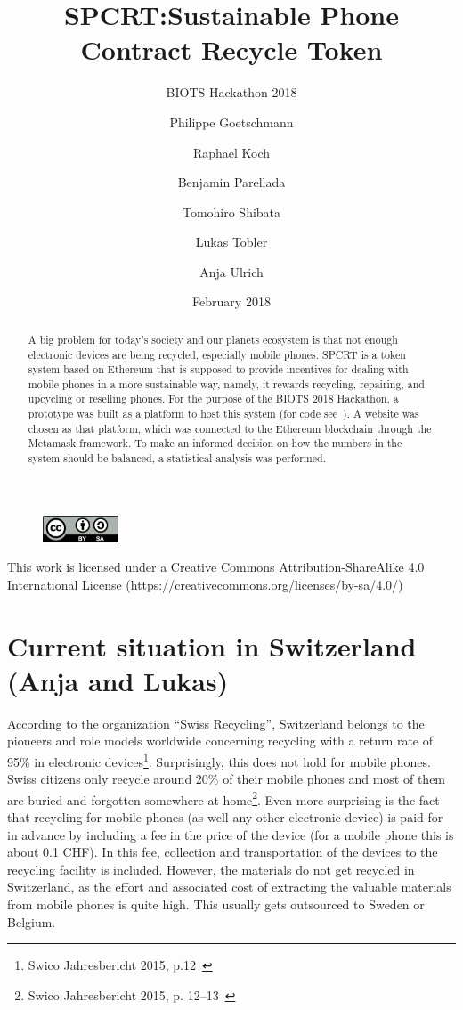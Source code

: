 \documentclass[11pt]{scrartcl}
\title{SPCRT:\@ Sustainable Phone Contract Recycle Token}
\subtitle{BIOTS Hackathon 2018}
\author{%
    Philippe Goetschmann
    \and
    Raphael Koch
    \and
    Benjamin Parellada
    \and
    Tomohiro Shibata
    \and
    Lukas Tobler
    \and
    Anja Ulrich
}
\date{February 2018}
\begin{document}
%
\maketitle
%
\begin{center}
    \begin{figure}[h]
        \centering
        \includegraphics[width=0.2\textwidth]{img/cc_license.png}
        \vspace{-0.3cm}
    \end{figure}
    This work is licensed under a Creative Commons Attribution-ShareAlike 4.0
    International License (https://creativecommons.org/licenses/by-sa/4.0/)
\end{center}

\begin{abstract}
    A big problem for today's society and our planets ecosystem is that not
    enough electronic devices are being recycled, especially mobile phones.
    SPCRT is a token system based on Ethereum that is supposed to provide
    incentives for dealing with mobile phones in a more sustainable way, namely,
    it rewards recycling, repairing, and upcycling or reselling phones.  For
    the purpose of the BIOTS 2018 Hackathon, a prototype was built as a platform
    to host this system (for code see~\cite{spcgit}).  A website was chosen as that
    platform, which was connected to the Ethereum blockchain through the
    Metamask framework. To make an informed decision on how the numbers in the
    system should be balanced, a statistical analysis was performed.
\end{abstract}

\section{Current situation in Switzerland (Anja and Lukas)}

According to the organization ``Swiss Recycling'', Switzerland belongs to the pioneers and role models worldwide concerning recycling with a return rate of 95\% in electronic devices\footnote{Swico Jahresbericht 2015, p.12~\cite{swico}}. Surprisingly, this does not hold for mobile phones. Swiss citizens only recycle around 20\% of their mobile phones and most of them are buried and forgotten somewhere at home\footnote{Swico Jahresbericht 2015, p. 12--13~\cite{swico}}. Even more surprising is the fact that recycling for mobile phones (as well any other electronic device) is paid for in advance by including a fee in the price of the device (for a mobile phone this is about 0.1 CHF). In this fee, collection and transportation of the devices to the recycling facility is included. However, the materials do not get recycled in Switzerland, as the effort and associated cost of extracting the valuable materials from mobile phones is quite high. This usually gets outsourced to Sweden or Belgium.
\end{document}
